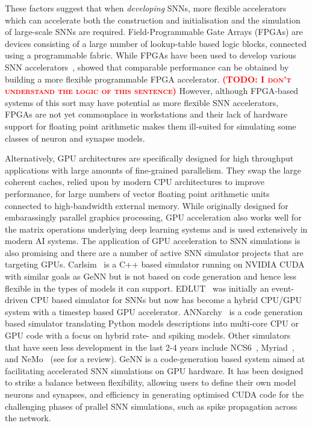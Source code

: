 \documentclass[utf8]{frontiersSCNS} %
\newcommand{\todo}[1]{\textbf{\textsc{\textcolor{red}{(TODO: #1)}}}}
\begin{document}
These factors suggest that when \textit{developing} SNNs, more flexible accelerators which can accelerate both the construction and initialisation and the simulation of large-scale SNNs are required.
Field-Programmable Gate Arrays (FPGAs) are devices consisting of a large number of lookup-table based logic blocks, connected using a programmable fabric.
While FPGAs have been used to develop various SNN accelerators~\citep{Moore2012,Wang2018}, \citet{Naylor2013} showed that comparable performance can be obtained by building a more flexible programmable FPGA accelerator. \todo{I don't understand the logic of this sentence}
However, although FPGA-based systems of this sort may have potential as more flexible SNN accelerators, FPGAs are not yet commonplace in workstations and their lack of hardware support for floating point arithmetic makes them ill-suited for simulating some classes of neuron and synapse models. 

Alternatively, GPU architectures are specifically designed for high throughput applications with large amounts of fine-grained parallelism.
They swap the large coherent caches, relied upon by modern CPU architectures to improve performance, for large numbers of vector floating point arithmetic units connected to high-bandwidth external memory. While originally designed for embarassingly parallel graphics processing, GPU acceleration also works well for the matrix operations underlying deep learning systems and is used extensively in modern AI systems. The application of GPU acceleration to SNN simulations is also promising and there are a number of active SNN simulator projects that are targeting GPUs. Carlsim~\citep{Chou2018} is a C++ based simulator running on NVIDIA CUDA with similar goals as GeNN but is not based on code generation and hence less flexible in the types of models it can support.
EDLUT~\citep{Garrido2011} was initially an event-driven CPU based simulator for SNNs but now has become a hybrid CPU/GPU system with a timestep based GPU accelerator.
ANNarchy~\citep{Vitay2015} is a code generation based simulator translating Python models descriptions into multi-core CPU or GPU code with a focus on hybrid rate- and spiking models.
Other simulators that have seen less development in the last 2-4 years include NCS6~\citep{Hoang2013}, Myriad~\citep{Rittner2016}, and NeMo~\citep{Fidjeland2009} (see \citet{Brette2012} for a review).
GeNN \citep{Yavuz2016} is a code-generation based system aimed at facilitating accelerated SNN simulations on GPU hardware. It has been designed to strike a balance between flexibility, allowing users to define their own model neurons and synapses, and efficiency in generating optimised CUDA code for the challenging phases of prallel SNN simulations, such as spike propagation across the network.
\end{document}
